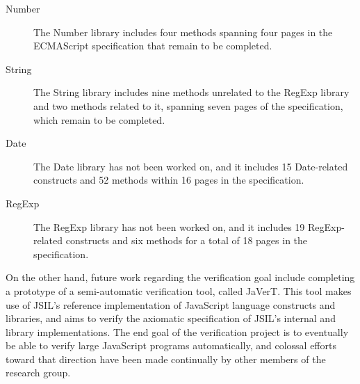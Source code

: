 \documentclass[a4paper,11pt,twoside]{report}
\begin{document}
\begin{description}
\item[Number] The Number library includes four methods spanning four pages in the ECMAScript specification that remain to be completed. 
\item[String] The String library includes nine methods unrelated to the RegExp library and two methods related to it, spanning seven pages of the specification, which remain to be completed.
\item[Date] The Date library has not been worked on, and it includes 15 Date-related constructs and 52 methods within 16 pages in the specification.
\item[RegExp] The RegExp library has not been worked on, and it includes 19 RegExp-related constructs and six methods for a total of 18 pages in the specification.
\end{description}

On the other hand, future work regarding the verification goal include completing a prototype of a semi-automatic verification tool, called JaVerT. This tool makes use of JSIL's reference implementation of JavaScript language constructs and libraries, and aims to verify the axiomatic specification of JSIL's internal and library implementations. The end goal of the verification project is to eventually be able to verify large JavaScript programs automatically, and colossal efforts toward that direction have been made continually by other members of the research group.



\end{document}
